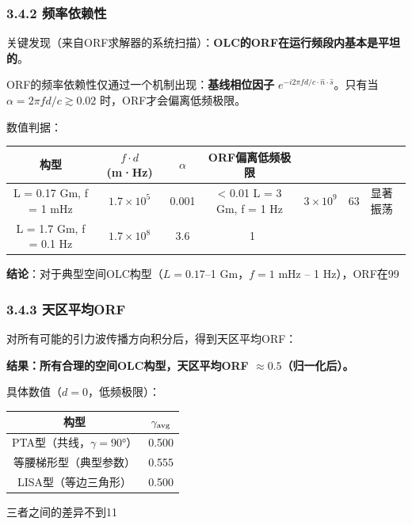 \documentclass[12pt,a4paper]{article}
\begin{document}
\subsubsection{3.4.2 频率依赖性}


关键发现（来自ORF求解器的系统扫描）：\textbf{OLC的ORF在运行频段内基本是平坦的}。

ORF的频率依赖性仅通过一个机制出现：\textbf{基线相位因子} $e^{-i2\pi fd/c \cdot \hat{n}\cdot\hat{s}}$。只有当 $\alpha = 2\pi fd/c \gtrsim 0.02$ 时，ORF才会偏离低频极限。

数值判据：

\begin{tabular}{|c|c|c|c|}
\hline
构型 & $f \cdot d$ (m·Hz) & $\alpha$ & ORF偏离低频极限 \\
\hline
L = 0.17 Gm, f = 1 mHz & $1.7 \times 10^5$ & 0.001 & < 0.01%
L = 3 Gm, f = 1 Hz & $3 \times 10^9$ & 63 & 显著振荡 \\
L = 1.7 Gm, f = 0.1 Hz & $1.7 \times 10^8$ & 3.6 & ~1%
\hline
\end{tabular}


\textbf{结论}：对于典型空间OLC构型（$L = 0.17$–1 Gm，$f = 1$ mHz – 1 Hz），ORF在99%

\subsubsection{3.4.3 天区平均ORF}


对所有可能的引力波传播方向积分后，得到天区平均ORF：

\textbf{结果：所有合理的空间OLC构型，天区平均ORF $\approx 0.5$（归一化后）。}

具体数值（$d = 0$，低频极限）：

\begin{tabular}{|c|c|}
\hline
构型 & $\gamma_{\rm avg}$ \\
\hline
PTA型（共线，$\gamma = 90°$） & 0.500 \\
等腰梯形型（典型参数） & 0.555 \\
LISA型（等边三角形） & 0.500 \\
\hline
\end{tabular}


三者之间的差异不到11%
\end{document}
